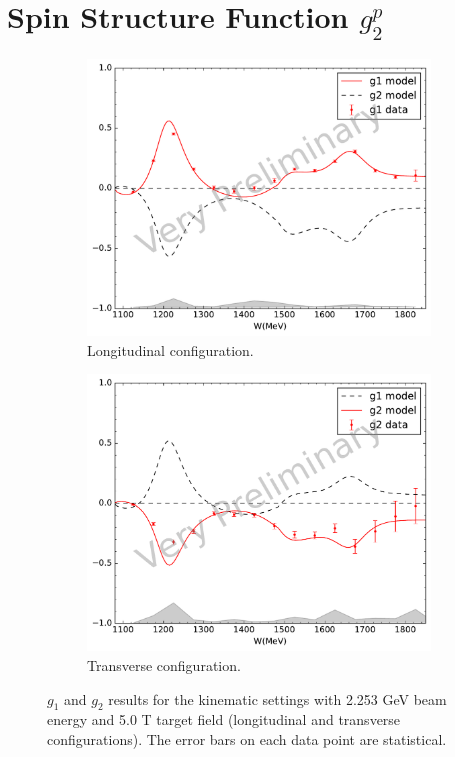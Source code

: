 \section{\texorpdfstring{Spin Structure Function $g_2^p$}{Spin Structure Function g2p}}
\label{C8S4}

\begin{figure}[p!]
  \centering
  \begin{subfigure}[t]{0.79\textwidth}
    \includegraphics[width=\textwidth]{figs/g1g2-model-22535000.pdf}
    \caption{Longitudinal configuration. \label{C8S4F1a}}
  \end{subfigure}
  \begin{subfigure}[t]{0.79\textwidth}
    \includegraphics[width=\textwidth]{figs/g1g2-model-22535090.pdf}
    \caption{Transverse configuration. \label{C8S4F1b}}
  \end{subfigure}
  \caption[$g_1$ and $g_2$ results with $E=2.253$ GeV and $B=5.0$ T.]{$g_1$ and $g_2$ results for the kinematic settings with 2.253 GeV beam energy and 5.0 T target field (longitudinal and transverse configurations). The error bars on each data point are statistical. \label{C8S4F1}}
\end{figure}

